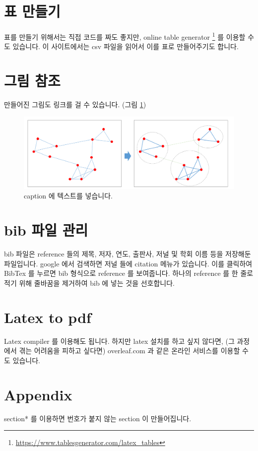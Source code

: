 \documentclass[11pt]{article}
\begin{document}
\section{표 만들기}

표를 만들기 위해서는 직접 코드를 짜도 좋지만, online table generator \footnote{\url{https://www.tablesgenerator.com/latex_tables}} 를 이용할 수도 있습니다. 
이 사이트에서는 csv 파일을 읽어서 이를 표로 만들어주기도 합니다.

\section{그림 참조}

만들어진 그림도 링크를 걸 수 있습니다. (그림 \ref{fig:community_detection})

\begin{figure}[ht]
\centering
\includegraphics[keepaspectratio=true, width=0.5\linewidth]{figures/community_detection.png}
\caption{caption 에 텍스트를 넣습니다.}
\label{fig:community_detection}
\end{figure}

\section{bib 파일 관리}

bib 파일은 reference 들의 제목, 저자, 연도, 출판사, 저널 및 학회 이름 등을 저장해둔 파일입니다.
google 에서 검색하면 저널 들에 citation 메뉴가 있습니다.
이를 클릭하여 BibTex 를 누르면 bib 형식으로 reference 를 보여줍니다.
하나의 reference 를 한 줄로 적기 위해 줄바꿈을 제거하여 bib 에 넣는 것을 선호합니다.

\section{Latex to pdf}

Latex compiler 를 이용해도 됩니다.
하지만 latex 설치를 하고 싶지 않다면, (그 과정에서 겪는 어려움을 피하고 싶다면) overleaf.com 과 같은 온라인 서비스를 이용할 수도 있습니다.

%



\section*{Appendix}

section* 를 이용하면 번호가 붙지 않는 section 이 만들어집니다.
\end{document}

